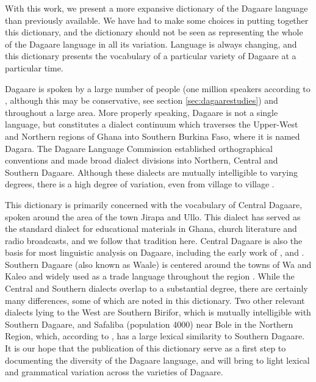 \begin{refsection}

With this work, we present a more expansive dictionary of the Dagaare language than previously available. We have had to make some choices in putting together this dictionary, and the dictionary should not be seen as representing the whole of the Dagaare language in all its variation.   Language is always changing, and this dictionary presents the vocabulary of a particular variety of Dagaare at a particular time.  

Dagaare is spoken by a large number of people (one million speakers according to \citealt{Ethnologue}, although this may be conservative, see section \ref{sec:dagaarestudies}) and throughout a large area.  More properly speaking, Dagaare is not a single language, but constitutes a dialect continuum which traverses the Upper-West  and Northern regions of Ghana into Southern Burkina Faso, where it is named Dagara.  The Dagaare Language Commission \citep{DagaareLanguageCommission1982} established  orthographical conventions and made broad dialect divisions into Northern, Central and Southern Dagaare.  Although these dialects are mutually intelligible to varying degrees, there is a high degree of variation, even from village to village \citep[2-5]{Bodomo1997}.   

This dictionary is primarily concerned with the vocabulary of Central Dagaare, spoken around the area of the town Jirapa and Ullo.  This dialect has served as the standard dialect for educational materials in Ghana, church literature and radio broadcasts, and we follow that tradition here.   Central Dagaare is also the basis for most linguistic analysis on Dagaare, including the early work of \citet{Wilson1962}, \citet{Kennedy1966} and \citet{Hall1977}.  Southern Dagaare (also known as Waale) is centered around the towns of Wa and Kaleo and widely used as a trade language throughout the region \citep{Bodomo1997}. While the Central and Southern dialects overlap to a substantial degree, there are certainly many differences, some of which are noted in this dictionary.  Two other relevant dialects lying to the West are Southern Birifor, which is mutually intelligible with Southern Dagaare, and Safaliba (population 4000) near Bole in the Northern Region, which, according to \citet{Ethnologue}, has a large lexical similarity to Southern Dagaare.  It is our hope that the publication of this dictionary serve as a first step to documenting the diversity of the Dagaare language, and will bring to light lexical and grammatical variation across the varieties of Dagaare.    


\end{refsection}
